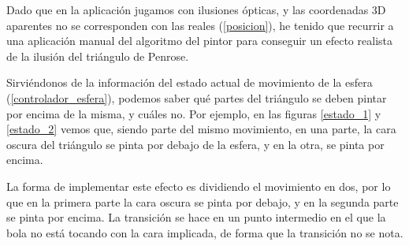 \documentclass[a4paper,12pt]{article}
\begin{document}
Dado que en la aplicación jugamos con ilusiones ópticas, y las coordenadas 3D aparentes no se corresponden con las reales (\ref{posicion}), he tenido que recurrir a una aplicación manual del algoritmo del pintor para conseguir un efecto realista de la ilusión del triángulo de Penrose.

Sirviéndonos de la información del estado actual de movimiento de la esfera (\ref{controlador_esfera}), podemos saber qué partes del triángulo se deben pintar por encima de la misma, y cuáles no. Por ejemplo, en las figuras \ref{estado_1} y \ref{estado_2} vemos que, siendo parte del mismo movimiento, en una parte, la cara oscura del triángulo se pinta por debajo de la esfera, y en la otra, se pinta por encima.

La forma de implementar este efecto es dividiendo el movimiento en dos, por lo que en la primera parte la cara oscura se pinta por debajo, y en la segunda parte se pinta por encima. La transición se hace en un punto intermedio en el que la bola no está tocando con la cara implicada, de forma que la transición no se nota.
\end{document}
